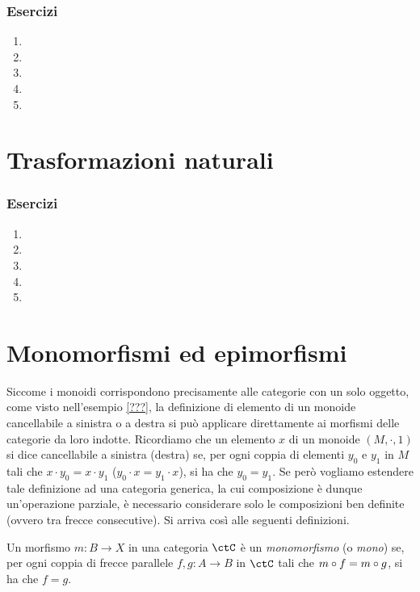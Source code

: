 \subsubsection*{Esercizi}
\begin{enumerate}
    \item
    \item
    \item
    \item
    \item
\end{enumerate}


\section{Trasformazioni naturali}

\subsubsection*{Esercizi}
\begin{enumerate}
    \item
    \item
    \item
    \item
    \item
\end{enumerate}

\section{Monomorfismi ed epimorfismi}

Siccome i monoidi corrispondono precisamente alle categorie con un solo oggetto, come visto nell'esempio \ref{???},
la definizione di elemento di un monoide cancellabile a sinistra o a destra si può applicare direttamente ai morfismi delle categorie da loro indotte.
Ricordiamo che un elemento \(x\) di un monoide \((M, \cdot, 1)\) si dice cancellabile a sinistra (destra) se,
per ogni coppia di elementi \(y_0\) e \(y_1\) in \(M\) tali che \(x \cdot y_0 = x \cdot y_1\) (\(y_0 \cdot x = y_1 \cdot x\)),
si ha che \(y_0 = y_1\).
Se però vogliamo estendere tale definizione ad una categoria generica,
la cui composizione è dunque un'operazione parziale,
è necessario considerare solo le composizioni ben definite
(ovvero tra frecce consecutive).
Si arriva così alle seguenti definizioni.

\begin{definition}[Monomorfismo]
	Un morfismo \(m \colon B \to X\) in una categoria \(\ctC\) è un \emph{monomorfismo} (o \emph{mono}) se,
	per ogni coppia di frecce parallele \(f, g \colon A \to B\) in \(\ctC\) tali che \(m \circ f = m \circ g\), si ha che \(f = g\).
\end{definition}

